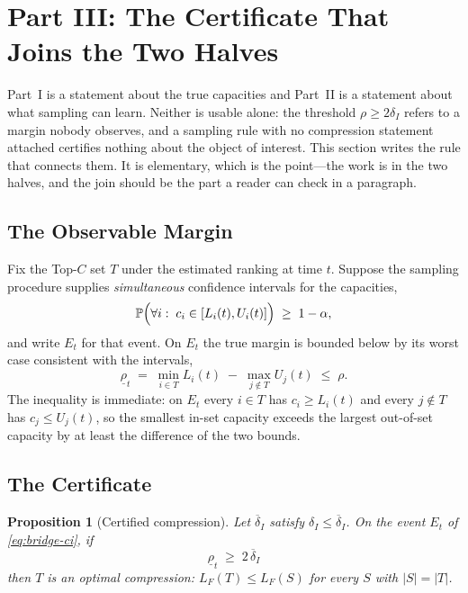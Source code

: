 \documentclass[conference]{IEEEtran}
\newtheorem{proposition}[theorem]{Proposition}
\theoremstyle{definition}
\begin{document}
\section{Part III: The Certificate That Joins the Two Halves}
\label{sec:bridge}

Part~I is a statement about the true capacities and Part~II is a statement about what
sampling can learn. Neither is usable alone: the threshold $\rho\ge2\delta_{I}$ refers to a
margin nobody observes, and a sampling rule with no compression statement attached certifies
nothing about the object of interest. This section writes the rule that connects them. It is
elementary, which is the point---the work is in the two halves, and the join should be the
part a reader can check in a paragraph.

\subsection{The Observable Margin}

Fix the Top-$C$ set $T$ under the estimated ranking at time $t$. Suppose the sampling
procedure supplies \emph{simultaneous} confidence intervals for the capacities,
\begin{equation}
\mathbb{P}\Bigl(\forall i:\;c_{i}\in[L_{i}(t),U_{i}(t)]\Bigr)\;\ge\;1-\alpha ,
\label{eq:bridge-ci}
\end{equation}
and write $E_{t}$ for that event. On $E_{t}$ the true margin is bounded below by its worst
case consistent with the intervals,
\begin{equation}
\underline{\rho}_{t}\;=\;\min_{i\in T}L_{i}(t)\;-\;\max_{j\notin T}U_{j}(t)
\;\le\;\rho .
\label{eq:bridge-rho}
\end{equation}
The inequality is immediate: on $E_{t}$ every $i\in T$ has $c_{i}\ge L_{i}(t)$ and every
$j\notin T$ has $c_{j}\le U_{j}(t)$, so the smallest in-set capacity exceeds the largest
out-of-set capacity by at least the difference of the two bounds.

\subsection{The Certificate}

\begin{proposition}[Certified compression]
\label{prop:certificate}
Let $\overline{\delta}_{I}$ satisfy $\delta_{I}\le\overline{\delta}_{I}$. On the event
$E_{t}$ of \eqref{eq:bridge-ci}, if
\begin{equation}
\underline{\rho}_{t}\;\ge\;2\,\overline{\delta}_{I}
\label{eq:bridge-rule}
\end{equation}
then $T$ is an optimal compression: $L_{F}(T)\le L_{F}(S)$ for every $S$ with $|S|=|T|$.
\end{proposition}
\end{document}
